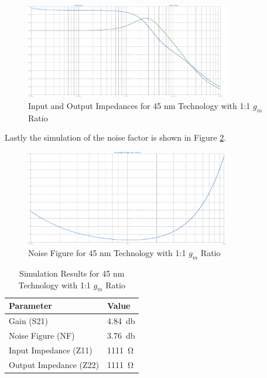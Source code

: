 \begin{figure}[H]
    \centering
    \includegraphics[width=0.8\textwidth]{Images/Imp_45_1To1.png}
    \caption{Input and Output Impedances for 45 nm Technology with 1:1 $g_m$ Ratio}
    \label{fig:ZParam45nm1to1}
\end{figure}

Lastly the simulation of the noise factor is shown in Figure \ref{fig:Noise45nm1to1}.
\begin{figure}[H]
    \centering
    \includegraphics[width=0.8\textwidth]{Images/Noise_45_1To1.png}
    \caption{Noise Figure for 45 nm Technology with 1:1 $g_m$ Ratio}
    \label{fig:Noise45nm1to1}
\end{figure}

\begin{table}[H]
    \centering
    \caption{Simulation Results for 45 nm Technology with 1:1 $g_m$ Ratio}
    \begin{tabularx}{\textwidth}{>{\centering\arraybackslash}X >{\centering\arraybackslash}X }
        \toprule
        \textbf{Parameter} & \textbf{Value}\\
        \midrule
        Gain (S21) & \SI{4.84}{\decibel} \\
        \midrule
        Noise Figure (NF) & \SI{3.76}{\decibel} \\
        \midrule
        Input Impedance (Z11) & \SI{1111}{\ohm} \\
        \midrule
        Output Impedance (Z22) & \SI{1111}{\ohm} \\
        \bottomrule
    \end{tabularx}
    \label{tab:45nm_1to1_results}
\end{table}

